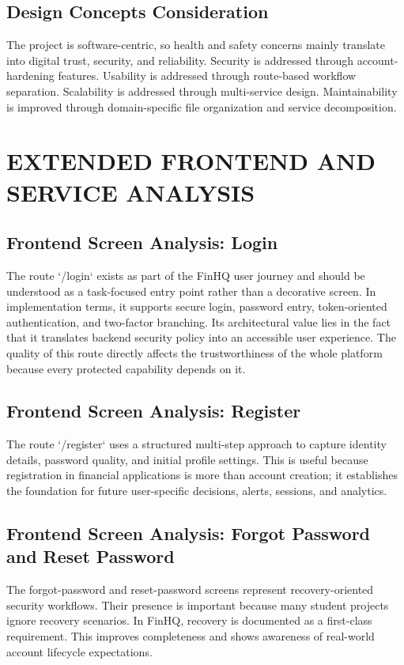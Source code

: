 \documentclass[12pt,a4paper]{report}
\newcommand{\projectshort}{FinHQ}
\begin{document}
\section{Design Concepts Consideration}
The project is software-centric, so health and safety concerns mainly translate into digital trust, security, and reliability. Security is addressed through account-hardening features. Usability is addressed through route-based workflow separation. Scalability is addressed through multi-service design. Maintainability is improved through domain-specific file organization and service decomposition.

\chapter{EXTENDED FRONTEND AND SERVICE ANALYSIS}
\section{Frontend Screen Analysis: Login}
The route `/login` exists as part of the \projectshort{} user journey and should be understood as a task-focused entry point rather than a decorative screen. In implementation terms, it supports secure login, password entry, token-oriented authentication, and two-factor branching. Its architectural value lies in the fact that it translates backend security policy into an accessible user experience. The quality of this route directly affects the trustworthiness of the whole platform because every protected capability depends on it.

\section{Frontend Screen Analysis: Register}
The route `/register` uses a structured multi-step approach to capture identity details, password quality, and initial profile settings. This is useful because registration in financial applications is more than account creation; it establishes the foundation for future user-specific decisions, alerts, sessions, and analytics.

\section{Frontend Screen Analysis: Forgot Password and Reset Password}
The forgot-password and reset-password screens represent recovery-oriented security workflows. Their presence is important because many student projects ignore recovery scenarios. In \projectshort{}, recovery is documented as a first-class requirement. This improves completeness and shows awareness of real-world account lifecycle expectations.
\end{document}
